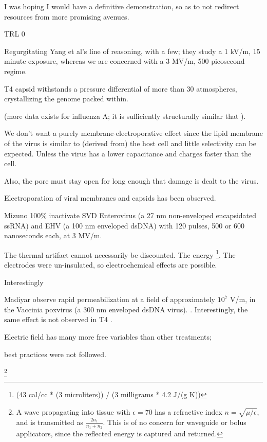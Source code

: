 \documentclass[paper.tex]{subfiles}
\begin{document}
I was hoping I would have a definitive demonstration, so as to not redirect resources from more promising avenues.


TRL 0


Regurgitating Yang et al's line of reasoning, with a few; they study a 1 kV/m, 15 minute exposure, whereas we are concerned with a 3 MV/m, 500 picosecond regime. 


T4 capsid withstands a pressure differential of more than 30 atmospheres, crystallizing the genome packed within. \cite{Osmotic2003}





(more data exists for influenza A; it is sufficiently structurally similar that ).


We don't want a purely membrane-electroporative effect since the lipid membrane of the virus is similar to (derived from) the host cell and little selectivity can be expected. Unless the virus has a lower capacitance and charges faster than the cell.

Also, the pore must stay open for long enough that damage is dealt to the virus. 



Electroporation of viral membranes and capsids has been observed.

Mizuno \cite{Inactivation1990} 100\% inactivate SVD Enterovirus (a 27 nm non-enveloped encapsidated ssRNA) and EHV (a 100 nm enveloped dsDNA) with 120 pulses, 500 or 600 nanoseconds each, at 3 MV/m. 

The thermal artifact cannot necessarily be discounted. The energy \footnote{(43 cal/cc * (3 microliters)) / (3 milligrams * 4.2 J/(g K))}. The electrodes were un-insulated, so electrochemical effects are possible.

Interestingly


Madiyar observe rapid permeabilization at a field of approximately $10^7$ V/m, in the Vaccinia poxvirus (a 300 nm enveloped dsDNA virus). \cite{AC2017}. Interestingly, the same effect is not observed in T4 \cite{Manipulation2013}. 








Electric field has many more free variables than other treatments; 



best practices were not followed.

\footnote{A wave propagating into tissue with $\epsilon=70$ has a refractive index $n=\sqrt{\mu/\epsilon}$, and is transmitted as $\frac{2 n_1}{n_1 + n_2}$. This is of no concern for waveguide or bolus applicators, since the reflected energy is captured and returned.}
\end{document}
